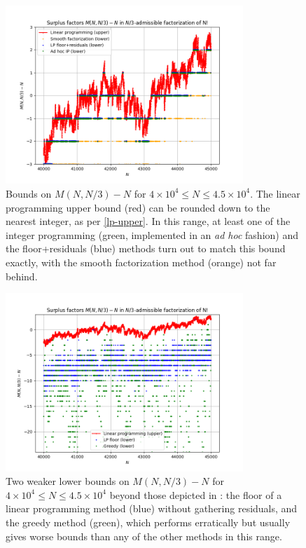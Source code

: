 \documentclass[12pt,a4paper,reqno]{amsart}
\numberwithin{equation}{section}
\theoremstyle{plain}
\theoremstyle{definition}
\begin{document}
    \begin{figure}
      \centering
      \includegraphics[width=0.8\textwidth]{surplus.png}
      \vspace{-12pt}
      \caption{\small Bounds on $M(N,N/3)-N$ for $4 \times 10^4 \leq N \leq 4.5 \times 10^4$.  The linear programming upper bound (red) can be rounded down to the nearest integer, as per \eqref{lp-upper}.  In this range, at least one of the integer programming (green, implemented in an \emph{ad hoc} fashion) and the floor+residuals (blue) methods turn out to match this bound exactly, with the smooth factorization method (orange) not far behind.}
      \label{fig-surplus}
      \end{figure}

      \begin{figure}
        \centering
        \includegraphics[width=0.8\textwidth]{surplus2.png}
        \vspace{-16pt}
        \caption{\small Two weaker lower bounds on $M(N,N/3)-N$ for $4 \times 10^4 \leq N \leq 4.5 \times 10^4$ beyond those depicted in : the floor of a linear programming method (blue) without gathering residuals, and the greedy method (green), which performs erratically but usually gives worse bounds than any of the other methods in this range.}
        \label{fig-surplus2}
        \end{figure}
\end{document}
